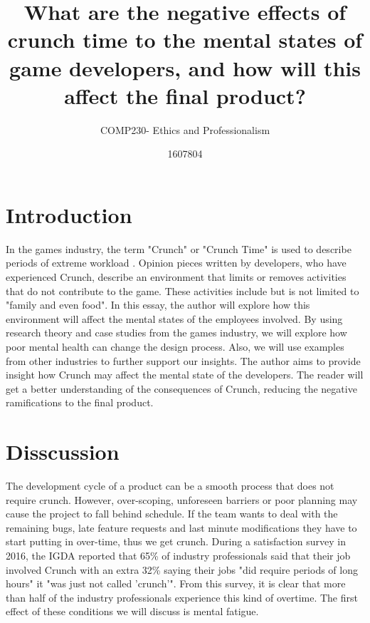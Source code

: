 \documentclass{scrartcl}
\title{What are the negative effects of crunch time to the mental states of game developers, and how will this affect the final product? }
\subtitle{COMP230- Ethics and Professionalism}
\author{1607804}
\begin{document}
\maketitle


\section{Introduction}
In the games industry, the term "Crunch" or "Crunch Time" is used to describe periods of extreme workload \cite[p. 468]{edholm2017crunch}. Opinion pieces written by developers, who have experienced Crunch, describe an environment that limits or removes activities that do not contribute to the game. These activities include but is not limited to "family and even food"\cite{schreier_2017}. In this essay, the author will explore how this environment will affect the mental states of the employees involved. By using research theory and case studies from the games industry, we will explore how poor mental health can change the design process. Also, we will use examples from other industries to further support our insights. The author aims to provide insight how Crunch may affect the mental state of the developers. The reader will get a better understanding of the consequences of Crunch, reducing the negative ramifications to the final product.

\section{Disscussion}
The development cycle of a product can be a smooth process that does not require crunch. However,  over-scoping, unforeseen barriers or poor planning may cause the project to fall behind schedule. If the team wants to deal with the remaining bugs, late feature requests and last minute modifications they have to start putting in over-time, thus we get crunch\cite{onlineWebl}\cite{edholm2017crunch}. During a satisfaction survey in 2016, the IGDA reported that 65\%  of industry professionals said that their job involved Crunch with an extra 32\%  saying their jobs "did require periods of long hours" it "was just not called 'crunch'"\cite[p.20]{weststarlegault2016}. From this survey, it is clear that more than half of the industry professionals experience this kind of overtime. The first effect of these conditions we will discuss is mental fatigue.
\end{document}
